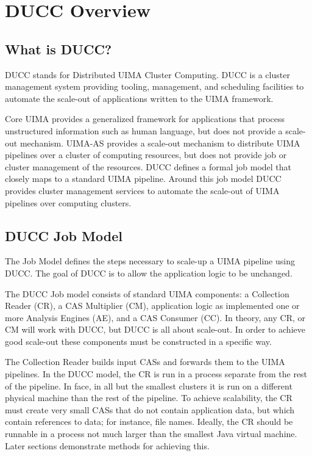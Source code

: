 \chapter{DUCC Overview}

    \section{What is DUCC?}

    DUCC stands for Distributed UIMA Cluster Computing. DUCC is a cluster management system
    providing tooling, management, and scheduling facilities to automate the scale-out of
    applications written to the UIMA framework.

    Core UIMA provides a generalized framework for applications that process unstructured
    information such as human language, but does not provide a scale-out mechanism. UIMA-AS provides
    a scale-out mechanism to distribute UIMA pipelines over a cluster of computing resources, but
    does not provide job or cluster management of the resources. DUCC defines a formal job model
    that closely maps to a standard UIMA pipeline. Around this job model DUCC provides cluster
    management services to automate the scale-out of UIMA pipelines over computing clusters.

    \section{DUCC Job Model}

    The Job Model defines the steps necessary to scale-up a UIMA pipeline using DUCC.  The goal of
    DUCC is to allow the application logic to be unchanged.

    The DUCC Job model consists of standard UIMA components: a Collection Reader (CR), a CAS
    Multiplier (CM), application logic as implemented one or more Analysis Engines (AE), and a CAS
    Consumer (CC).  In theory, any CR, or CM will work with DUCC, but DUCC is all about scale-out.  In
    order to achieve good scale-out these components must be constructed in a specific way.

    The Collection Reader builds input CASs and forwards them to the UIMA pipelines.  In the DUCC
    model, the CR is run in a process separate from the rest of the pipeline. In face, in all but the
    smallest clusters it is run on a different physical machine than the rest of the pipeline.  To
    achieve scalability, the CR must create very small CASs that do not contain application data,
    but which contain references to data; for instance, file names.  Ideally, the CR should be
    runnable in a process not much larger than the smallest Java virtual machine.  Later sections
    demonstrate methods for achieving this.

